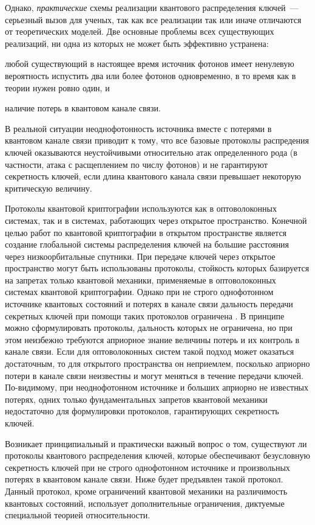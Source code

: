 Однако, \textit{практические} схемы реализации квантового распределения ключей~--- серьезный вызов для ученых, так как все реализации так или иначе отличаются от теоретических моделей. 
Две основные проблемы всех существующих реализаций, ни одна из которых не может быть эффективно устранена: 
\begin{inparaenum}[\itshape 1\upshape)]
\item любой существующий в настоящее время источник фотонов имеет ненулевую вероятность испустить два или более фотонов одновременно, в то время как в теории нужен ровно один, и
\item наличие потерь в квантовом канале связи.
\end{inparaenum}

В реальной ситуации неоднофотонность источника вместе с потерями в квантовом канале связи приводит к тому, что все базовые протоколы распредения ключей оказываются неустойчивыми относительно атак определенного рода (в частности, атака с расщеплением по числу фотонов) и не гарантируют секретность ключей, если длина квантового канала связи превышает некоторую критическую величину. 

Протоколы квантовой криптографии используются как в оптоволоконных системах, так и в системах, работающих через открытое пространство.
Конечной целью работ по квантовой криптографии в открытом пространстве является создание глобальной системы распределения ключей на большие расстояния через низкоорбитальные спутники. 
При передаче ключей через открытое пространство могут быть использованы протоколы, стойкость которых базируется на запретах только квантовой механики, применяемые в оптоволоконных системах квантовой криптографии. 
Однако при не строго однофотонном источнике квантовых состояний и потерях в канале связи дальность передачи секретных ключей при помощи таких протоколов ограничена \cite{scarani2009secpraquakeydis}. 
В принципе можно сформулировать протоколы, дальность которых не ограничена, но при этом неизбежно требуются априорное знание величины потерь и их контроль в канале связи. 
Если для оптоволоконных систем такой подход может оказаться достаточным, то для открытого пространства он неприемлем, посколько априорно потери в канале связи неизвестны и могут меняться в течение передачи ключей. По-видимому, при неоднофотонном источнике и больших априорно не известных потерях, одних только фундаментальных запретов квантовой механики недостаточно для формулировки протоколов, гарантирующих секретность ключей.

Возникает принципиальный и практически важный вопрос о том, существуют ли протоколы квантового распределения ключей, которые обеспечивают безусловную секретность ключей при не строго 
однофотонном источнике и произвольных потерях в квантовом канале связи. Ниже будет предъявлен такой протокол. Данный протокол, кроме ограничений квантовой механики на различимость квантовых состояний, использует дополнительные ограничения, диктуемые специальной теорией относительности.

